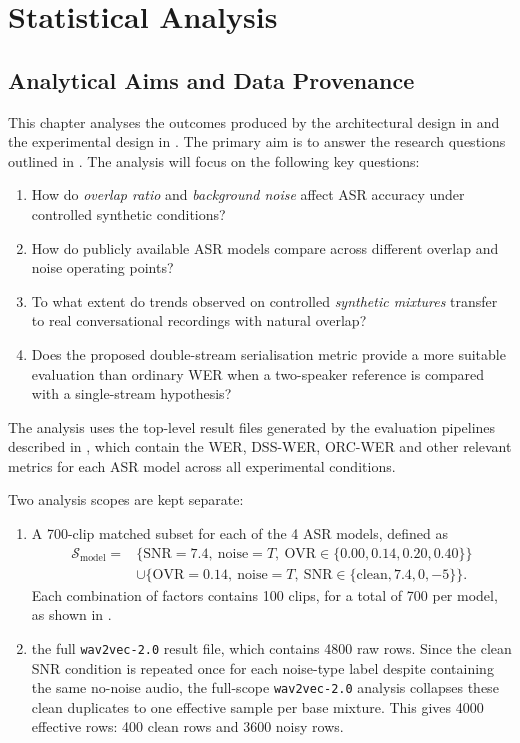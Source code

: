 \chapter{Statistical Analysis}
\label{chap:statistical_analysis}
\section{Analytical Aims and Data Provenance}
This chapter analyses the outcomes produced by the architectural design in  and the experimental design in . The primary aim is to answer the research questions outlined in . The analysis will focus on the following key questions:
\begin{enumerate}[label=\textbf{RQ\arabic*:}, leftmargin=*]
    \item How do \emph{overlap ratio} and \emph{background noise} affect ASR accuracy under controlled synthetic conditions?
    \item How do publicly available ASR models compare across different overlap and noise operating points?
    \item To what extent do trends observed on controlled \emph{synthetic mixtures} transfer to real conversational recordings with natural overlap?
    \item Does the proposed double-stream serialisation metric provide a more suitable evaluation than ordinary WER when a two-speaker reference is compared with a single-stream hypothesis?
\end{enumerate}
The analysis uses the top-level result files generated by the evaluation pipelines described in , which contain the WER, DSS-WER, ORC-WER and other relevant metrics for each ASR model across all experimental conditions. 

Two analysis scopes are kept separate:
\begin{enumerate}
    \item A 700-clip matched subset for each of the 4 ASR models, defined as
    \begin{equation}
        \begin{split}
        \mathcal{S}_{\mathrm{model}} ={}&
        \{\mathrm{SNR}=7.4,\ \mathrm{noise}=T,\ \mathrm{OVR}\in\{0.00,0.14,0.20,0.40\}\}\\
        &\cup
        \{\mathrm{OVR}=0.14,\ \mathrm{noise}=T,\ \mathrm{SNR}\in\{\mathrm{clean},7.4,0,-5\}\}.
        \end{split}
    \end{equation}
    Each combination of factors contains 100 clips, for a total of 700 per model, as shown in . 
    \item the full \texttt{wav2vec-2.0} result file, which contains 4800 raw rows. Since the clean SNR condition is repeated once for each noise-type label despite containing the same no-noise audio, the full-scope \texttt{wav2vec-2.0} analysis collapses these clean duplicates to one effective sample per base mixture. This gives 4000 effective rows: 400 clean rows and 3600 noisy rows.   
\end{enumerate}

